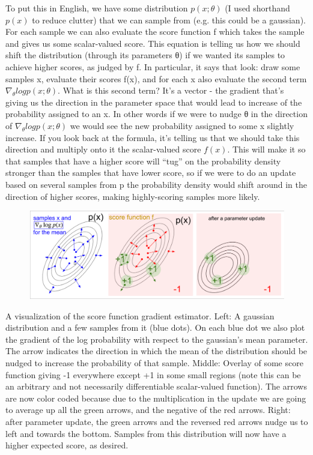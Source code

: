 \documentclass[14pt,a4paper]{report}  %
\begin{document}
To put this in English, we have some distribution $p(x;\theta)$ (I used shorthand $p(x)$ to reduce clutter) that we can sample from (e.g. this could be a gaussian). For each sample we can also evaluate the score function f which takes the sample and gives us some scalar-valued score. This equation is telling us how we should shift the distribution (through its parameters θ) if we wanted its samples to achieve higher scores, as judged by f. In particular, it says that look: draw some samples x, evaluate their scores f(x), and for each x also evaluate the second term $\nabla_\theta logp(x;θ)$. What is this second term? It’s a vector - the gradient that’s giving us the direction in the parameter space that would lead to increase of the probability assigned to an x. In other words if we were to nudge θ in the direction of $\nabla_\theta logp(x;θ)$ we would see the new probability assigned to some x slightly increase. If you look back at the formula, it’s telling us that we should take this direction and multiply onto it the scalar-valued score $f(x)$. This will make it so that samples that have a higher score will “tug” on the probability density stronger than the samples that have lower score, so if we were to do an update based on several samples from p the probability density would shift around in the direction of higher scores, making highly-scoring samples more likely.
\begin{figure}[hbt!]
\begin{center}
\includegraphics[scale=0.4]{figure}
\end{center}
\end{figure}
\qquad A visualization of the score function gradient estimator. Left: A gaussian distribution and a few samples from it (blue dots). On each blue dot we also plot the gradient of the log probability with respect to the gaussian's mean parameter. The arrow indicates the direction in which the mean of the distribution should be nudged to increase the probability of that sample. Middle: Overlay of some score function giving -1 everywhere except +1 in some small regions (note this can be an arbitrary and not necessarily differentiable scalar-valued function). The arrows are now color coded because due to the multiplication in the update we are going to average up all the green arrows, and the negative of the red arrows. Right: after parameter update, the green arrows and the reversed red arrows nudge us to left and towards the bottom. Samples from this distribution will now have a higher expected score, as desired.\\
\newpage
\end{document}
